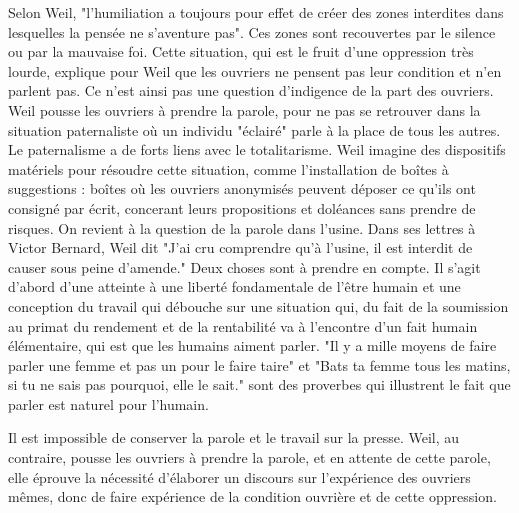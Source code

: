 \documentclass[a4paper,12pt]{book}
\begin{document}
\par Selon Weil, "l'humiliation a toujours pour effet de créer des zones interdites dans lesquelles la pensée ne s'aventure pas". Ces zones sont recouvertes par le silence ou par la mauvaise foi. Cette situation, qui est le fruit d'une oppression très lourde, explique pour Weil que les ouvriers ne pensent pas leur condition et n'en parlent pas. Ce n'est ainsi pas une question d'indigence de la part des ouvriers. Weil pousse les ouvriers à prendre la parole, pour ne pas se retrouver dans la situation paternaliste où un individu "éclairé" parle à la place de tous les autres. Le paternalisme a de forts liens avec le totalitarisme. Weil imagine des dispositifs matériels pour résoudre cette situation, comme l'installation de boîtes à suggestions : boîtes où les ouvriers anonymisés peuvent déposer ce qu'ils ont consigné par écrit, concerant leurs propositions et doléances sans prendre de risques. On revient à la question de la parole dans l'usine. Dans ses lettres à Victor Bernard, Weil dit "J'ai cru comprendre qu'à l'usine, il est interdit de causer sous peine d'amende." Deux choses sont à prendre en compte. Il s'agit d'abord d'une atteinte à une liberté fondamentale de l'être humain et une conception du travail qui débouche sur une situation qui, du fait de la soumission au primat du rendement et de la rentabilité va à l'encontre d'un fait humain élémentaire, qui est que les humains aiment parler. "Il y a mille moyens de faire parler une femme et pas un pour le faire taire" et "Bats ta femme tous les matins, si tu ne sais pas pourquoi, elle le sait." sont des proverbes qui illustrent le fait que parler est naturel pour l'humain.
\par Il est impossible de conserver la parole et le travail sur la presse. Weil, au contraire, pousse les ouvriers à prendre la parole, et en attente de cette parole, elle éprouve la nécessité d'élaborer un discours sur l'expérience des ouvriers mêmes, donc de faire expérience de la condition ouvrière et de cette oppression.
\end{document}
